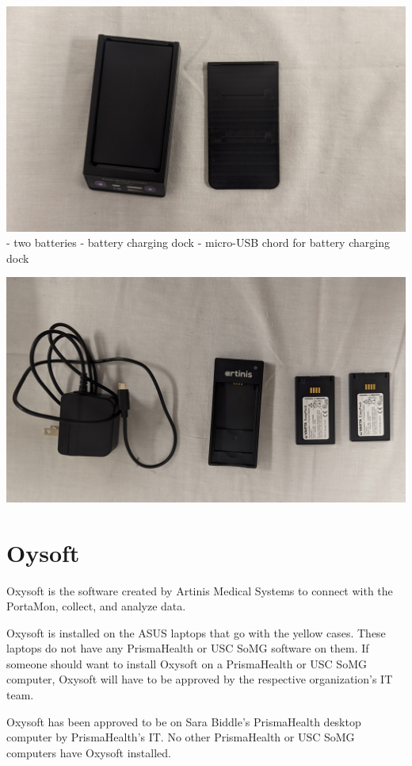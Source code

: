 \documentclass[
]{book}
\begin{document}
\includegraphics[width=1\linewidth]{images/portamon/portamonopen}
- two batteries
- battery charging dock
- micro-USB chord for battery charging dock

\includegraphics[width=1\linewidth]{images/portamon/portamonbatteriesandcharger}

\hypertarget{Oxysoft}{%
\section{Oysoft}\label{Oxysoft}}

Oxysoft is the software created by Artinis Medical Systems to connect with the PortaMon, collect, and analyze data.

Oxysoft is installed on the ASUS laptops that go with the yellow cases. These laptops do not have any PrismaHealth or USC SoMG software on them. If someone should want to install Oxysoft on a PrismaHealth or USC SoMG computer, Oxysoft will have to be approved by the respective organization's IT team.

Oxysoft has been approved to be on Sara Biddle's PrismaHealth desktop computer by PrismaHealth's IT. No other PrismaHealth or USC SoMG computers have Oxysoft installed.
\end{document}
